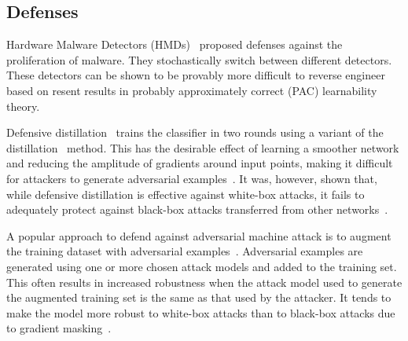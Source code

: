 
\subsection{Defenses}

 Hardware Malware Detectors (HMDs)~\cite{RHMD2017} proposed defenses against the proliferation of malware. They stochastically switch between different detectors. These detectors can be shown to be provably more difficult to
reverse engineer based on resent results in probably approximately
correct (PAC) learnability theory. 



Defensive distillation~\cite{papernot2016distillation} trains the classifier in two rounds using a variant of the
distillation~\cite{hinton2015distilling} method. This has the desirable effect of learning a smoother network
and reducing the amplitude of gradients around input points, making it difficult for attackers to
generate adversarial examples~\cite{papernot2016distillation}. It was, however, shown that, while defensive
distillation is effective against white-box attacks, it fails to adequately protect against black-box
attacks transferred from other networks~\cite{Carlini2017}.

A popular approach to defend against adversarial machine attack is to augment the training dataset with adversarial examples~\cite{szegedy2014going, Goodfellow2015ADVexample, moosavidezfooli2016deepfool}. Adversarial examples are generated using one or more chosen attack models and added to the training
set. This often results in increased robustness when the attack model used to generate the augmented
training set is the same as that used by the attacker. It tends to make the model more robust to white-box attacks than to black-box attacks due to gradient masking~\cite{Papernot2016TowardsTS, tramer2020ensemble}.




